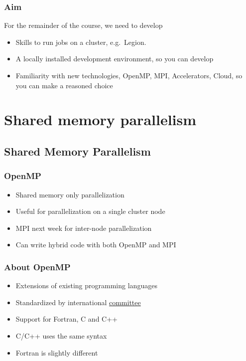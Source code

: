 \subsubsection{Aim}\label{aim-3}

For the remainder of the course, we need to develop

\begin{itemize}
\itemsep1pt\parskip0pt
\item
  Skills to run jobs on a cluster, e.g.~Legion.
\item
  A locally installed development environment, so you can develop
\item
  Familiarity with new technologies, OpenMP, MPI, Accelerators, Cloud,
  so you can make a reasoned choice
\end{itemize}

\section{Shared memory parallelism}\label{shared-memory-parallelism}

\subsection{Shared Memory
Parallelism}\label{shared-memory-parallelism-1}

\subsubsection{OpenMP}\label{openmp}

\begin{itemize}
\itemsep1pt\parskip0pt
\item
  Shared memory only parallelization
\item
  Useful for parallelization on a single cluster node
\item
  MPI next week for inter-node parallelization
\item
  Can write hybrid code with both OpenMP and MPI
\end{itemize}

\subsubsection{About OpenMP}\label{about-openmp}

\begin{itemize}
\itemsep1pt\parskip0pt
\item
  Extensions of existing programming languages
\item
  Standardized by international \href{http://openmp.org/}{committee}
\item
  Support for Fortran, C and C++
\item
  C/C++ uses the same syntax
\item
  Fortran is slightly different
\end{itemize}

